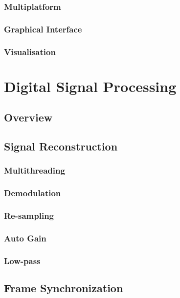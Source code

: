 \documentclass[a4paper,12pt,twoside,openright]{report}
\begin{document}
\subsubsection{Multiplatform}

\subsubsection{Graphical Interface}

\subsubsection{Visualisation}

\section{Digital Signal Processing}

\subsection{Overview}

\subsection{Signal Reconstruction}

\subsubsection{Multithreading}

\subsubsection{Demodulation}

\subsubsection{Re-sampling}

\subsubsection{Auto Gain}

\subsubsection{Low-pass}

\subsection{Frame Synchronization}
\end{document}
